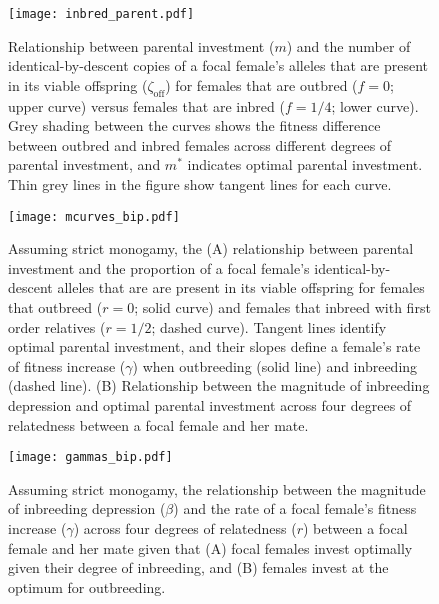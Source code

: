 \documentclass[12pt]{article}
\begin{document}
\clearpage
\begin{figure}
\begin{center}				
\texttt{[image: inbred\_parent.pdf]}
\end{center}
\caption{Relationship between parental investment ($m$) and the number of identical-by-descent copies of a focal female's alleles that are present in its viable offspring ($\zeta_{\textrm{off}}$) for females that are outbred ($f=0$; upper curve) versus females that are inbred ($f=1/4$; lower curve). Grey shading between the curves shows the fitness difference between outbred and inbred females across different degrees of parental investment, and $m^{*}$ indicates optimal parental investment. Thin grey lines in the figure show tangent lines for each curve.}
\label{inbred_parent}
\end{figure}

\clearpage
\begin{figure}
\begin{center}				
\texttt{[image: mcurves\_bip.pdf]}
\end{center}
\caption{Assuming strict monogamy, the (A) relationship between parental investment and the proportion of a focal female's identical-by-descent alleles that are are present in its viable offspring for females that outbreed ($r=0$; solid curve) and females that inbreed with first order relatives ($r=1/2$; dashed curve). Tangent lines identify optimal parental investment, and their slopes define a female's rate of fitness increase ($\gamma$) when outbreeding (solid line) and inbreeding (dashed line). (B) Relationship between the magnitude of inbreeding depression and optimal parental investment across four degrees of relatedness between a focal female and her mate.}
\label{mcurves_bip}
\end{figure}

\clearpage
\begin{figure}
\begin{center}				
\texttt{[image: gammas\_bip.pdf]}
\end{center}
\caption{Assuming strict monogamy, the relationship between the magnitude of inbreeding depression ($\beta$) and the rate of a focal female's fitness increase ($\gamma$) across four degrees of relatedness ($r$) between a focal female and her mate given that (A) focal females invest optimally given their degree of inbreeding, and (B) females invest at the optimum for outbreeding.}
\label{gammas_bip}
\end{figure}
\end{document}

